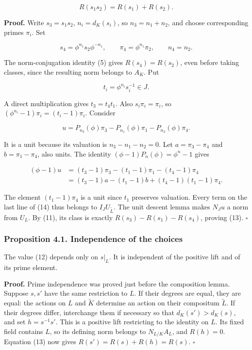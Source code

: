 \documentclass[11pt,a4paper]{article}
\begin{document}
\[
R(s_1s_2)=R(s_1)+R(s_2).
\tag{13}
\]

\textbf{Proof.} Write \(s_3=s_1s_2\), \(n_i=d_K(s_i)\), so
\(n_3=n_1+n_2\), and choose corresponding primes \(\pi_i\). Set

\[
s_4=\phi^{n_1}s_2\phi^{-n_1},\qquad
\pi_4=\phi^{n_1}\pi_2,\qquad n_4=n_2.
\]

The norm-conjugation identity (5) gives \(R(s_4)=R(s_2)\), even before
taking classes, since the resulting norm belongs to \(A_K\). Put

\[
t_i=\phi^{n_i}s_i^{-1}\in J.
\]

A direct multiplication gives \(t_3=t_4t_1\). Also \(s_i\pi_i=\pi_i\),
so \((\phi^{n_i}-1)\pi_i=(t_i-1)\pi_i\). Consider

\[
u=P_{n_3}(\phi)\pi_3-P_{n_1}(\phi)\pi_1
-P_{n_2}(\phi)\pi_4.
\]

It is a unit because its valuation is \(n_3-n_1-n_2=0\). Let
\(a=\pi_3-\pi_4\) and \(b=\pi_1-\pi_4\), also units. The identity
\((\phi-1)P_n(\phi)=\phi^n-1\) gives

\[
\begin{aligned}
(\phi-1)u
&=(t_3-1)\pi_3-(t_1-1)\pi_1-(t_4-1)\pi_4\\
&=(t_3-1)a-(t_1-1)b+(t_4-1)(t_1-1)\pi_4.
\end{aligned}
\tag{14}
\]

The element \((t_1-1)\pi_4\) is a unit since \(t_1\) preserves
valuation. Every term on the last line of (14) thus belongs to
\(I_JU_{\widetilde L}\). The unit descent lemma makes \(N_Ju\) a norm
from \(U_L\). By (11), its class is exactly \(R(s_3)-R(s_1)-R(s_4)\),
proving (13). \(\square\)

\subsubsection{Proposition 4.1. Independence of the
choices}\label{proposition-4.1.-independence-of-the-choices}

The value (12) depends only on \(s|_L\). It is independent of the
positive lift and of its prime element.

\textbf{Proof.} Prime independence was proved just before the
composition lemma. Suppose \(s,s'\) have the same restriction to \(L\).
If their degrees are equal, they are equal: the actions on \(L\) and
\(\widetilde K\) determine an action on their compositum
\(\widetilde L\). If their degrees differ, interchange them if necessary
so that \(d_K(s')>d_K(s)\), and set \(h=s^{-1}s'\). This is a positive
lift restricting to the identity on \(L\). Its fixed field contains
\(L\), so its defining norm belongs to \(N_{L/K}A_L\), and \(R(h)=0\).
Equation (13) now gives \(R(s')=R(s)+R(h)=R(s)\). \(\square\)
\end{document}
